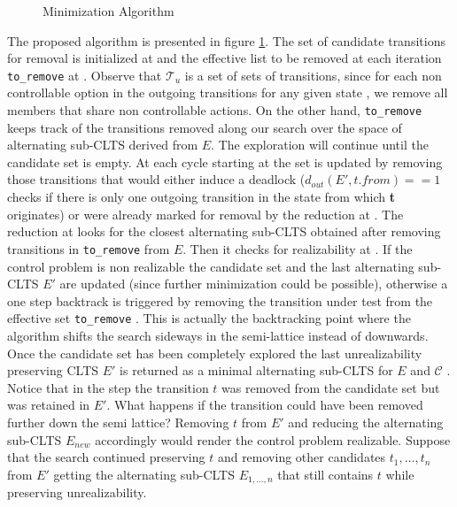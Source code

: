 \begin{figure}[ht]
	\begin{center}
		 
		\caption{Minimization Algorithm}
		\label{fig:clts_dfs-code}
	\end{center}
\end{figure}

The proposed algorithm is
presented in figure \ref{fig:clts_dfs-code}. The set of 
candidate transitions
for removal is initialized at  and the effective list
to be removed at each iteration \texttt{to\_remove} at
. Observe that $\mathcal{T}_u$ is a set of sets of transitions, since for each non controllable option in the outgoing transitions for any given state , we remove all members that share non controllable actions. On the other hand, \texttt{to\_remove} keeps track of the transitions
removed along our search over the space of
alternating sub-CLTS derived from $E$.  The exploration
will continue until the candidate set is empty.
At each cycle starting at  the set is updated by 
removing those transitions that would either induce a deadlock   
($d_{out}(E', t.from) == 1$ checks if there is only one
outgoing transition in the state from which \textbf{t} originates) or were already marked for removal by the reduction
at .
The reduction at  looks for the closest
alternating sub-CLTS obtained after removing 
transitions in \texttt{to\_remove} from $E$.
Then it checks for realizability at .  If the control problem is non
realizable the candidate set and the last 
alternating sub-CLTS $E'$ are updated (since further minimization could be
possible), otherwise a one step backtrack
is triggered by removing the transition under test from
the effective set \texttt{to\_remove} .
This is actually the backtracking point where the algorithm
shifts the search sideways in the semi-lattice instead of downwards.
Once the candidate set has been completely explored
the last unrealizability preserving CLTS $E'$ is
returned as a minimal alternating sub-CLTS
for $E$ and $\mathcal{C}$ .
Notice that
in the step  the transition $t$ was removed
from the candidate set but was retained in $E'$.  What happens if
the transition could have been removed further down the semi lattice?  Removing $t$ from $E'$ and reducing the alternating sub-CLTS 
$E_{new}$ accordingly would render the control problem realizable.  Suppose that
the search continued preserving $t$ and removing other candidates
$t_1, \ldots, t_n$ from $E'$ getting the alternating sub-CLTS
$E_{1,\ldots,n}$ that still contains $t$ while preserving unrealizability.
